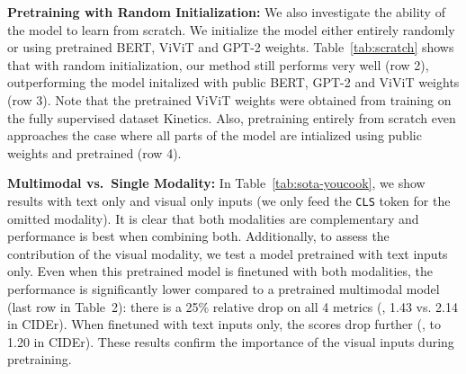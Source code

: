 \documentclass[10pt,twocolumn,letterpaper]{article}
\begin{document}
\noindent\textbf{Pretraining with Random Initialization:}
We also investigate the ability of the model to learn from scratch.
We initialize the model either entirely randomly or using pretrained BERT, ViViT and GPT-2 weights.
Table~\ref{tab:scratch} shows that with random initialization, our method still performs very well (row 2), outperforming the model initalized with public BERT, GPT-2 and ViViT weights (row 3). Note that the pretrained ViViT weights were obtained from training on the fully supervised dataset Kinetics. 
Also, pretraining entirely from scratch even approaches the case where all parts of the model are intialized using public weights and pretrained (row 4).

\noindent\textbf{Multimodal vs.\ Single Modality:}
In Table~\ref{tab:sota-youcook}, we show results with text only and visual only inputs (we only feed the \texttt{CLS} token for the omitted modality). It is clear that both modalities are complementary and performance is best when combining both.
Additionally, to assess the contribution of the visual modality, we test a model pretrained with text inputs only. Even when this pretrained model is finetuned with both modalities, the performance is significantly lower compared to a pretrained multimodal model (last row in Table~2): there is a 25\% relative drop on all 4 metrics (\eg, 1.43 vs. 2.14 in CIDEr).
When finetuned with text inputs only, the scores drop further (\eg, to 1.20 in CIDEr). These results confirm the importance of the visual inputs during pretraining.
\end{document}
